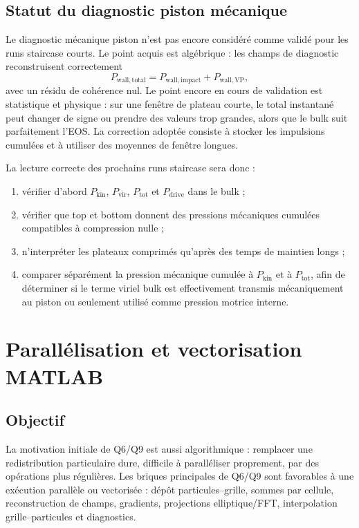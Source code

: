 \documentclass[11pt,a4paper]{article}
\begin{document}
\subsection{Statut du diagnostic piston mécanique}

Le diagnostic mécanique piston n'est pas encore considéré comme validé pour les runs staircase courts. Le point acquis est algébrique : les champs de diagnostic reconstruisent correctement
\begin{equation}
  P_{\mathrm{wall,total}} = P_{\mathrm{wall,impact}} + P_{\mathrm{wall,VP}},
\end{equation}
avec un résidu de cohérence nul. Le point encore en cours de validation est statistique et physique : sur une fenêtre de plateau courte, le total instantané peut changer de signe ou prendre des valeurs trop grandes, alors que le bulk suit parfaitement l'EOS. La correction adoptée consiste à stocker les impulsions cumulées et à utiliser des moyennes de fenêtre longues.

La lecture correcte des prochains runs staircase sera donc :
\begin{enumerate}[label=\arabic*)]
  \item vérifier d'abord \(P_{\mathrm{kin}}\), \(P_{\mathrm{vir}}\), \(P_{\mathrm{tot}}\) et \(P_{\mathrm{drive}}\) dans le bulk ;
  \item vérifier que top et bottom donnent des pressions mécaniques cumulées compatibles à compression nulle ;
  \item n'interpréter les plateaux comprimés qu'après des temps de maintien longs ;
  \item comparer séparément la pression mécanique cumulée à \(P_{\mathrm{kin}}\) et à \(P_{\mathrm{tot}}\), afin de déterminer si le terme viriel bulk est effectivement transmis mécaniquement au piston ou seulement utilisé comme pression motrice interne.
\end{enumerate}

\section{Parallélisation et vectorisation MATLAB}

\subsection{Objectif}

La motivation initiale de Q6/Q9 est aussi algorithmique : remplacer une redistribution particulaire dure, difficile à paralléliser proprement, par des opérations plus régulières. Les briques principales de Q6/Q9 sont favorables à une exécution parallèle ou vectorisée : dépôt particules--grille, sommes par cellule, reconstruction de champs, gradients, projections elliptique/FFT, interpolation grille--particules et diagnostics.
\end{document}
